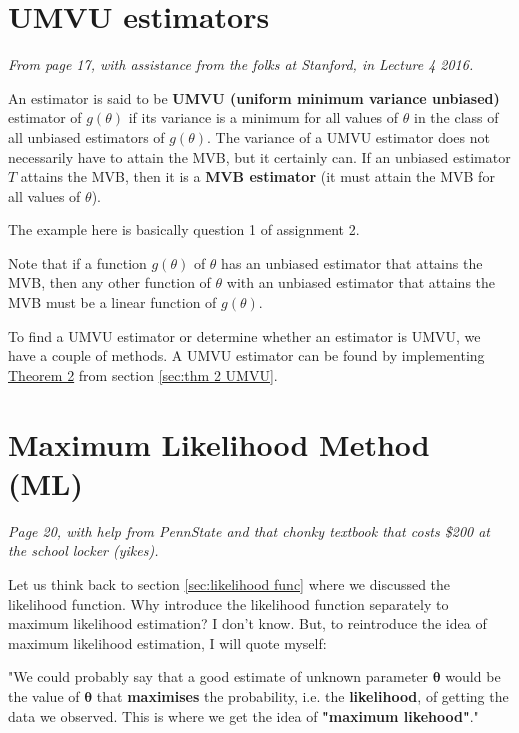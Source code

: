 \section{UMVU estimators}\label{sec:UMVU ests}

\textit{From page 17, with assistance from the folks at Stanford, \autocite{stanford} in Lecture 4 2016.}

An estimator is said to be \textbf{UMVU (uniform minimum variance unbiased)} estimator of \(g(\theta)\) if its variance is a minimum for all values of \(\theta\) in the class of all unbiased estimators of \(g(\theta)\). 
The variance of a UMVU estimator does not necessarily have to attain the MVB, but it certainly can.
If an unbiased estimator \(T\) attains the MVB, then it is a \textbf{MVB estimator} (it must attain the MVB for all values of \(\theta\)). 

\begin{example}
    The example here is basically question 1 of assignment 2.
\end{example}

Note that if a function \(g(\theta)\) of \(\theta\) has an unbiased estimator that attains the MVB, then any other function of \(\theta\) with an unbiased estimator that attains the MVB must be a linear function of \(g(\theta)\). 

To find a UMVU estimator or determine whether an estimator is UMVU, we have a couple of methods.
A UMVU estimator can be found by implementing \hyperref[thm:thm 2 UMVU]{Theorem 2} from section \ref{sec:thm 2 UMVU}. 

\section{Maximum Likelihood Method (ML)}\label{sec:ML method}

\textit{Page 20, with help from PennState and that chonky textbook that costs \$200 at the school locker (yikes). \autocite{penn415} \autocite{rice}}

Let us think back to section \ref{sec:likelihood func} where we discussed the likelihood function. 
Why introduce the likelihood function separately to maximum likelihood estimation? 
I don't know. But, to reintroduce the idea of maximum likelihood estimation, I will quote myself:

\bigskip

"We could probably say that a good estimate of unknown parameter \(\bm{\theta}\) would be the value of \(\bm{\theta}\) that \textbf{maximises} the probability, i.e. the \textbf{likelihood}, of getting the data we observed. 
This is where we get the idea of \textbf{"maximum likehood"}." 

